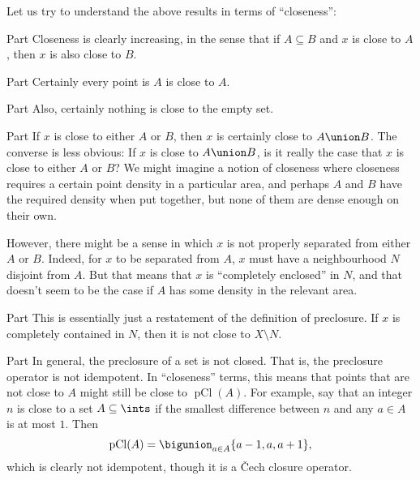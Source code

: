 \documentclass[article, a4paper, 11pt, oneside]{memoir}
\numberwithin{equation}{chapter}
\newcommand{\pCl}[1]{\operatorname{pCl}(#1)}
\begin{document}
Let us try to understand the above results in terms of \enquote{closeness}:
%
\begin{proofsec}
    \item[Part \subcref{enum:preclosure-increasing}]
    Closeness is clearly increasing, in the sense that if $A \subseteq B$ and $x$ is close to $A$, then $x$ is also close to $B$.
    
    \item[Part \subcref{enum:preclosure-extensive}]
    Certainly every point is $A$ is close to $A$.

    \item[Part \subcref{enum:preclosure-nullary-unions}]
    Also, certainly nothing is close to the empty set.

    \item[Part \subcref{enum:preclosure-binary-unions}]
    If $x$ is close to either $A$ or $B$, then $x$ is certainly close to $A \union B$. The converse is less obvious: If $x$ is close to $A \union B$, is it really the case that $x$ is close to either $A$ or $B$? We might imagine a notion of closeness where closeness requires a certain point density in a particular area, and perhaps $A$ and $B$ have the required density when put together, but none of them are dense enough on their own.

    However, there might be a sense in which $x$ is not properly separated from either $A$ or $B$. Indeed, for $x$ to be separated from $A$, $x$ must have a neighbourhood $N$ disjoint from $A$. But that means that $x$ is \enquote{completely enclosed} in $N$, and that doesn't seem to be the case if $A$ has some density in the relevant area.
    
    \item[Part \subcref{enum:preclosure-characterisation-of-nhoods}]
    This is essentially just a restatement of the definition of preclosure. If $x$ is completely contained in $N$, then it is not close to $X \setminus N$.

    \item[Part \subcref{enum:preclosure-inclusion-series}]
    In general, the preclosure of a set is not closed. That is, the preclosure operator is not idempotent. In \enquote{closeness} terms, this means that points that are not close to $A$ might still be close to $\pCl{A}$. For example, say that an integer $n$ is close to a set $A \subseteq \ints$ if the smallest difference between $n$ and any $a \in A$ is at most $1$. Then
    \begin{equation*}
        \pCl{A}
            = \bigunion_{a \in A} \{a-1, a, a+1\},
    \end{equation*}
    which is clearly not idempotent, though it is a \v{C}ech closure operator.


\end{proofsec}
\end{document}
